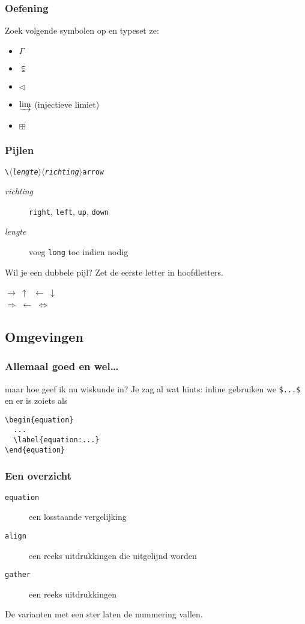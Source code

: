 \begin{frame}
  \frametitle{Oefening}

  Zoek volgende symbolen op en typeset ze:
  \begin{itemize}
	\item $\Gamma$
	\item $\subsetneqq$
	\item $\triangleleft$
	\item $\varinjlim$ (injectieve limiet)
	\item $\boxplus$
  \end{itemize}
\end{frame}

\begin{frame}[fragile]
  \frametitle{Pijlen}

  \texttt{\textcolor{uagreen}{\textbackslash}$\langle$\textsl{lengte}$\rangle\langle$\textsl{richting}$\rangle$\textcolor{uagreen}{arrow}}

  \begin{description}
    \item[\textsl{richting}] \texttt{right}, \texttt{left}, \texttt{up}, \texttt{down}
    \item[\textsl{lengte}] voeg \texttt{long} toe indien nodig
  \end{description}

  Wil je een dubbele pijl? Zet de eerste letter in hoofdletters.
  \begin{LTXexample}
$\rightarrow\ \uparrow\ $
$\leftarrow\ \downarrow$ \\
$\Rightarrow$
$\longleftarrow$
$\Leftrightarrow$
  \end{LTXexample}
\end{frame}


\subsection{Omgevingen}
\begin{frame}[fragile]
  \frametitle{Allemaal goed en wel\ldots}

  maar hoe geef ik nu wiskunde in? Je zag al wat hints: inline gebruiken we \verb|$...$| en er is zoiets als
  \begin{verbatim}
\begin{equation}
  ...
  \label{equation:...}
\end{equation}
  \end{verbatim}
\end{frame}

\begin{frame}[fragile]
  \frametitle{Een overzicht}

  \begin{description}
    \item[\texttt{equation}] een losstaande vergelijking
    \item[\texttt{align}] een reeks uitdrukkingen die uitgelijnd worden
    \item[\texttt{gather}] een reeks uitdrukkingen
  \end{description}

  De varianten met een ster laten de nummering vallen.
\end{frame}

